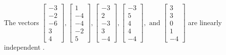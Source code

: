 \begin{exercise}
\begin{exerciseStatement}
  \end{exerciseStatement}
  \begin{exerciseAnswer}
   The vectors \(\left[\begin{array}{r}
-3 \\
-2 \\
-6 \\
3 \\
4
\end{array}\right] , \left[\begin{array}{r}
1 \\
-4 \\
-4 \\
-2 \\
5
\end{array}\right] , \left[\begin{array}{r}
-3 \\
2 \\
-3 \\
3 \\
-4
\end{array}\right] , \left[\begin{array}{r}
-3 \\
5 \\
4 \\
4 \\
-4
\end{array}\right] , \text{ and } \left[\begin{array}{r}
3 \\
3 \\
0 \\
1 \\
-4
\end{array}\right]\) are 
  	 linearly independent  .
  


  \end{exerciseAnswer}
\end{exercise}